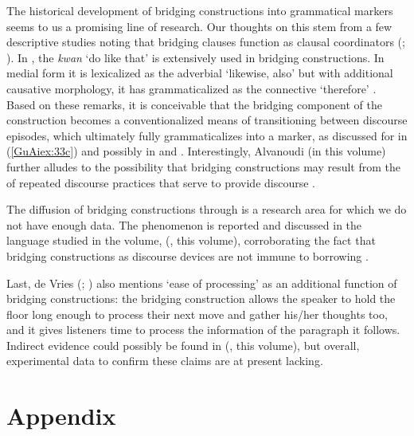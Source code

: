 \documentclass[output=paper]{LSP/langsci}
\begin{document}
The historical development of bridging constructions into grammatical markers seems to us a promising line of research. Our thoughts on this  stem from a few descriptive studies noting that bridging clauses function as clausal coordinators (\citealt[][314]{bromley81}; \citealt[][1327]{Jendraschek09}). In , the  \textit{kwan} `do like that' is extensively used in bridging constructions. In medial form it is lexicalized as the adverbial `likewise, also' but with additional causative morphology, it has grammaticalized as the connective `therefore' \citep[][29]{christensen13}. Based on these remarks, it is conceivable that the bridging component of the construction becomes a conventionalized means of transitioning between discourse episodes, which ultimately fully grammaticalizes into a  marker, as discussed for  in (\ref{GuAiex:33c}) and possibly in  \citep[][909, 913]{seifart10} and  \citep[][376--377]{devries.2005}. Interestingly, Alvanoudi (in this volume) further alludes to the possibility that bridging constructions may result from the  of repeated discourse practices that serve to provide discourse . 

The diffusion of bridging constructions through  is a research area for which we do not have enough data. The phenomenon is reported and discussed in the  language studied in the volume,  (\citeauthor{emlen18}, this volume), corroborating the fact that bridging constructions as discourse devices are not immune to borrowing \citep[][15, 17]{aikhenvald2006}.                           

Last, de Vries (\citeyear[][378]{devries.2005}; \citeyear[][817]{devries.2006}) also mentions `ease of processing' as an additional function of bridging constructions: the bridging construction allows the speaker to hold the floor long enough to process their next  move and gather his/her thoughts too, and it gives listeners time to process the information of the paragraph it follows. Indirect evidence could possibly be found in  (\citeauthor{guerinchap18}, this volume), but overall, experimental data to confirm these claims are at present lacking.

\section*{Appendix}
\end{document}
